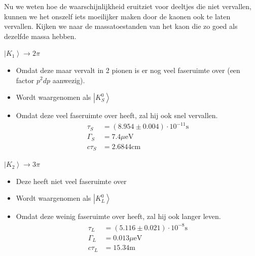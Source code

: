 \documentclass[../main.tex]{subfiles}
\begin{document}
Nu we weten hoe de waarschijnlijkheid eruitziet voor deeltjes die niet vervallen, kunnen we het onszelf iets moeilijker maken door de kaonen ook te laten vervallen. Kijken we naar de massatoestanden van het kaon die zo goed als dezelfde massa hebben.\\
\begin{minipage}[c]{0.5\textwidth}
    \begin{center}
        $\left| K_1 \right> \rightarrow 2\pi$
    \end{center}
    \begin{itemize}
        \item Omdat deze maar vervalt in 2 pionen is er nog veel faseruimte over (een factor $p^2 dp$ aanwezig).
        \item Wordt waargenomen als $\left| K_S^0 \right>$
        \item Omdat deze veel faseruimte over heeft, zal hij ook snel vervallen.
            \begin{equation}
                \begin{aligned}
                    \label{eq:verval_ks}
                    \tau_{S}&=(8.954 \pm 0.004) \cdot 10^{-11} \text{s}\\
                    \Gamma_S &= 7.4\mu\text{eV}\\
                    c\tau_S &= 2.6844\text{cm}
                \end{aligned}
            \end{equation}
    \end{itemize}
\end{minipage}\noindent
\begin{minipage}[c]{0.5\textwidth}
    \begin{center}
        $\left| K_2 \right> \rightarrow 3\pi$
    \end{center}
    \begin{itemize}
        \item Deze heeft niet veel faseruimte over
        \item Wordt waargenomen als $\left| K_L^0 \right>$
        \item Omdat deze weinig faseruimte over heeft, zal hij ook langer leven.
            \begin{equation}
                \begin{aligned}
                    \label{eq:verval_ks}
                    \tau_{L}&=(5.116 \pm 0.021) \cdot 10^{-8} \text{s}\\
                    \Gamma_L &= 0.013\mu\text{eV}\\
                    c\tau_L &= 15.34\text{m}
                \end{aligned}
            \end{equation}
    \end{itemize}
\end{minipage}
\end{document}
